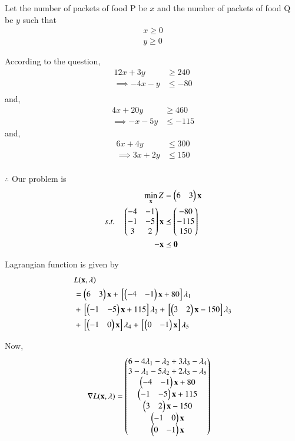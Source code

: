 \documentclass[journal,12pt,twocolumn]{IEEEtran}
\begin{document}
Let the number of packets of food P be $x$ and the number of packets of food Q be $y$  such that 
\begin{align}
    x \geq 0 \\
    y \geq 0 
\end{align}

According to the question,
\begin{align}
    12x+3y &\geq 240 \\
    \implies -4x-y &\leq -80 \\
\end{align}
and,
\begin{align}
    4x+20y &\geq 460 \\
    \implies -x-5y &\leq -115 
\end{align}
and,
\begin{align}
     6x+4y &\leq 300 \\
    \implies 3x+2y &\leq 150 \\
\end{align}

$\therefore$ Our problem is
\begin{align}
        \min_{\mathbf{x}} Z &= \begin{pmatrix}6 & 3\end{pmatrix}\mathbf{x}\\
        s.t. \quad 
        \begin{pmatrix}-4 & -1 \\ -1 & -5 \\ 3 & 2 \end{pmatrix}\mathbf{x} &\preceq \begin{pmatrix}-80\\-115\\150\end{pmatrix} \\
        \mathbf{-x} &\preceq \mathbf{0}
\end{align}

Lagrangian function is given by
\begin{equation}
\begin{aligned}
    &L(\mathbf{x},\lambda) \\ &= \begin{pmatrix}6 & 3\end{pmatrix}\mathbf{x}+{}\left[\begin{pmatrix}-4 & -1\end{pmatrix}\mathbf{x}+80\right]\lambda_1 \\ &+ {}\left[\begin{pmatrix}-1 & -5\end{pmatrix}\mathbf{x}+115\right]\lambda_2 +{}\left[\begin{pmatrix}3 & 2\end{pmatrix}\mathbf{x}-150\right]\lambda_3 \\ &+ {}\left[\begin{pmatrix}-1 & 0\end{pmatrix}\mathbf{x}\right]\lambda_4 +{}\left[\begin{pmatrix}0 & -1\end{pmatrix}\mathbf{x}\right]\lambda_5
\end{aligned}
\end{equation}

Now,
\begin{align}
    \nabla L(\mathbf{x},\lambda) &= \begin{pmatrix}6-4\lambda_1-\lambda_2+3\lambda_3-\lambda_4 \\ 3-\lambda_1-5\lambda_2+2\lambda_3-\lambda_5 \\ \begin{pmatrix}-4 & -1\end{pmatrix}\mathbf{x}+80 \\ \begin{pmatrix}-1 & -5\end{pmatrix}\mathbf{x}+115 \\ \begin{pmatrix}3 & 2\end{pmatrix}\mathbf{x}-150 \\ \begin{pmatrix}-1 & 0\end{pmatrix}\mathbf{x} \\ \begin{pmatrix}0 & -1\end{pmatrix}\mathbf{x}\end{pmatrix}
\end{align}
\end{document}

